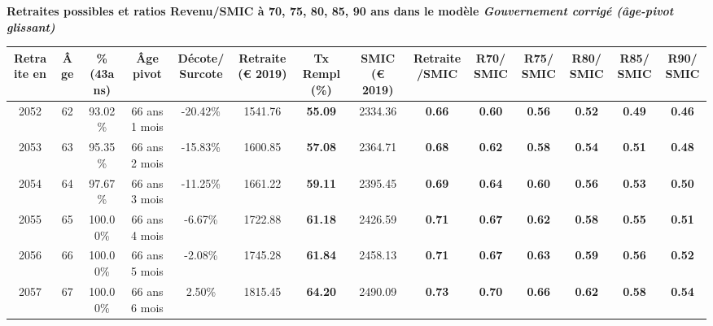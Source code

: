  \vspace{0.1cm} 
{\bf \noindent Retraites possibles et ratios Revenu/SMIC à 70, 75, 80, 85, 90 ans dans le modèle \emph{Gouvernement corrigé (âge-pivot glissant)}}  
 
\begin{adjustbox}{max width=\textwidth} 
\begin{tabular}[htb]{|c|c||c|c|c||c|c||c|c||c|c|c|c|c|} 
\hline 
 Retraite en &  Âge &  \%(43ans) &  Âge pivot &  Décote/Surcote &  Retraite (\euro{} 2019) &  Tx Rempl(\%) &  SMIC (\euro{} 2019) &  Retraite/SMIC &  R70/SMIC &  R75/SMIC &  R80/SMIC &  R85/SMIC &  R90/SMIC \\ 
\hline \hline 
 2052 &  62 &  93.02\% &  66 ans 1 mois &  -20.42\% &  1541.76 &  {\bf 55.09} &  2334.36 &  {\bf {\color{red} 0.66}} &  {\bf {\color{red} 0.60}} &  {\bf {\color{red} 0.56}} &  {\bf {\color{red} 0.52}} &  {\bf {\color{red} 0.49}} &  {\bf {\color{red} 0.46}} \\ 
\hline 
 2053 &  63 &  95.35\% &  66 ans 2 mois &  -15.83\% &  1600.85 &  {\bf 57.08} &  2364.71 &  {\bf {\color{red} 0.68}} &  {\bf {\color{red} 0.62}} &  {\bf {\color{red} 0.58}} &  {\bf {\color{red} 0.54}} &  {\bf {\color{red} 0.51}} &  {\bf {\color{red} 0.48}} \\ 
\hline 
 2054 &  64 &  97.67\% &  66 ans 3 mois &  -11.25\% &  1661.22 &  {\bf 59.11} &  2395.45 &  {\bf {\color{red} 0.69}} &  {\bf {\color{red} 0.64}} &  {\bf {\color{red} 0.60}} &  {\bf {\color{red} 0.56}} &  {\bf {\color{red} 0.53}} &  {\bf {\color{red} 0.50}} \\ 
\hline 
 2055 &  65 &  100.00\% &  66 ans 4 mois &  -6.67\% &  1722.88 &  {\bf 61.18} &  2426.59 &  {\bf {\color{red} 0.71}} &  {\bf {\color{red} 0.67}} &  {\bf {\color{red} 0.62}} &  {\bf {\color{red} 0.58}} &  {\bf {\color{red} 0.55}} &  {\bf {\color{red} 0.51}} \\ 
\hline 
 2056 &  66 &  100.00\% &  66 ans 5 mois &  -2.08\% &  1745.28 &  {\bf 61.84} &  2458.13 &  {\bf {\color{red} 0.71}} &  {\bf {\color{red} 0.67}} &  {\bf {\color{red} 0.63}} &  {\bf {\color{red} 0.59}} &  {\bf {\color{red} 0.56}} &  {\bf {\color{red} 0.52}} \\ 
\hline 
 2057 &  67 &  100.00\% &  66 ans 6 mois &  2.50\% &  1815.45 &  {\bf 64.20} &  2490.09 &  {\bf {\color{red} 0.73}} &  {\bf {\color{red} 0.70}} &  {\bf {\color{red} 0.66}} &  {\bf {\color{red} 0.62}} &  {\bf {\color{red} 0.58}} &  {\bf {\color{red} 0.54}} \\ 
\hline 
\hline 
\end{tabular} 
\end{adjustbox} 
 
